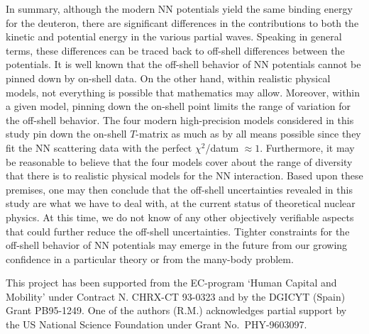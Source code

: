 In summary, although the modern NN potentials yield the same
binding energy for the deuteron, there are significant differences 
in the contributions to both the kinetic and potential energy
in the various partial waves. Speaking in general terms, these    
differences can be traced back to 
off-shell differences between the potentials.
It is well known that the off-shell behavior of NN potentials
cannot be pinned down by on-shell data.
On the other hand, within realistic physical models, not everything
is possible that mathematics may allow.
Moreover, within a given model, pinning down the on-shell point
limits the range of variation for the off-shell behavior.
The four modern high-precision models considered in this study pin
down the on-shell $T$-matrix as much as by all means possible since
they fit 
 the NN scattering data with the perfect $\chi^2$/datum
$\approx 1$. Furthermore, it may be reasonable to believe that the 
four models cover about the range of diversity that there is to realistic
 physical models
for the NN interaction. Based upon these premises, one may then conclude
 that the off-shell uncertainties revealed in this study are what we
 have to deal with, at the current 
status of theoretical nuclear physics. At this time, we do not know of any other
 objectively verifiable aspects that could further reduce the off-shell
 uncertainties.
Tighter constraints for the off-shell behavior of NN potentials may emerge
in the future from our growing confidence in a particular theory or from
 the many-body problem.




This project has been  supported from the EC-program `Human
Capital and Mobility' under Contract N. CHRX-CT 93-0323 and by the DGICYT
(Spain) Grant PB95-1249.
One of the authors (R.M.) acknowledges partial support
by the US National Science Foundation
under Grant No.\ PHY-9603097.


